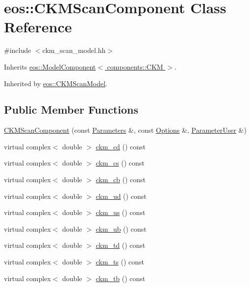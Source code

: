 \hypertarget{classeos_1_1CKMScanComponent}{
\section{eos::CKMScanComponent Class Reference}
\label{classeos_1_1CKMScanComponent}
}


{\ttfamily \#include $<$ckm\_\-scan\_\-model.hh$>$}

Inherits \hyperlink{classeos_1_1ModelComponent_3_01components_1_1CKM_01_4}{eos::ModelComponent$<$ components::CKM $>$}.

Inherited by \hyperlink{classeos_1_1CKMScanModel}{eos::CKMScanModel}.\subsection*{Public Member Functions}
\begin{DoxyCompactItemize}
\item 
\hyperlink{classeos_1_1CKMScanComponent_a32c081a531442445b5f5e472763c6326}{CKMScanComponent} (const \hyperlink{classeos_1_1Parameters}{Parameters} \&, const \hyperlink{classeos_1_1Options}{Options} \&, \hyperlink{classeos_1_1ParameterUser}{ParameterUser} \&)
\item 
virtual complex$<$ double $>$ \hyperlink{classeos_1_1CKMScanComponent_afcdd4f857807dcb95aa252f45cbc9e41}{ckm\_\-cd} () const 
\item 
virtual complex$<$ double $>$ \hyperlink{classeos_1_1CKMScanComponent_adb49ab08f60bdd5de0fccb3748cacf03}{ckm\_\-cs} () const 
\item 
virtual complex$<$ double $>$ \hyperlink{classeos_1_1CKMScanComponent_a420671fc6106cda58d97d82af85dddf3}{ckm\_\-cb} () const 
\item 
virtual complex$<$ double $>$ \hyperlink{classeos_1_1CKMScanComponent_a18ccfd1e6541233a32870e8d20ba4a1e}{ckm\_\-ud} () const 
\item 
virtual complex$<$ double $>$ \hyperlink{classeos_1_1CKMScanComponent_a1ac8c31a252962bd381b604a60fe914d}{ckm\_\-us} () const 
\item 
virtual complex$<$ double $>$ \hyperlink{classeos_1_1CKMScanComponent_ace753216c0814e933038548ed237d74b}{ckm\_\-ub} () const 
\item 
virtual complex$<$ double $>$ \hyperlink{classeos_1_1CKMScanComponent_aeb3351313d4c06d21f5d70431b835c5e}{ckm\_\-td} () const 
\item 
virtual complex$<$ double $>$ \hyperlink{classeos_1_1CKMScanComponent_ab2927bf32ec2c0b8ec13aca97b932129}{ckm\_\-ts} () const 
\item 
virtual complex$<$ double $>$ \hyperlink{classeos_1_1CKMScanComponent_af171390d63478b601257163ce568f819}{ckm\_\-tb} () const 
\end{DoxyCompactItemize}


